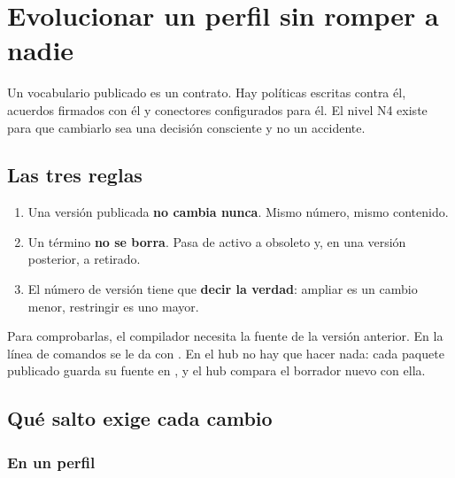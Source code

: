 \chapter{Evolucionar un perfil sin romper a nadie}
\label{ch:evolucion}

Un vocabulario publicado es un contrato. Hay políticas escritas contra él, acuerdos firmados con él y
conectores configurados para él. El nivel N4 existe para que cambiarlo sea una decisión consciente y no un
accidente.

\section{Las tres reglas}

\begin{ideaClave}
\begin{enumerate}[leftmargin=*, itemsep=1pt]
  \item Una versión publicada \textbf{no cambia nunca}. Mismo número, mismo contenido.
  \item Un término \textbf{no se borra}. Pasa de activo a obsoleto y, en una versión posterior, a retirado.
  \item El número de versión tiene que \textbf{decir la verdad}: ampliar es un cambio menor, restringir es uno mayor.
\end{enumerate}
\end{ideaClave}

Para comprobarlas, el compilador necesita la fuente de la versión anterior. En la línea de comandos se le da con
. En el hub no hay que hacer nada: cada paquete publicado guarda su fuente en
, y el hub compara el borrador nuevo con ella.

\section{Qué salto exige cada cambio}

\subsection{En un perfil}

